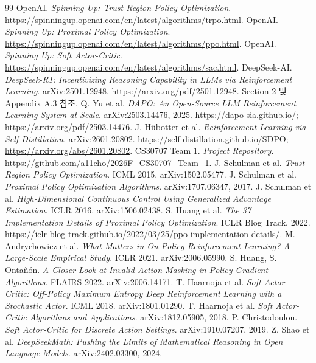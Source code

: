 \documentclass[11pt,a4paper]{article}
\begin{document}
\renewcommand{\refname}{참고 문헌 및 직접 링크}
\begingroup
\raggedright
\begin{thebibliography}{99}
 OpenAI. \emph{Spinning Up: Trust Region Policy Optimization}. \url{https://spinningup.openai.com/en/latest/algorithms/trpo.html}.
 OpenAI. \emph{Spinning Up: Proximal Policy Optimization}. \url{https://spinningup.openai.com/en/latest/algorithms/ppo.html}.
 OpenAI. \emph{Spinning Up: Soft Actor-Critic}. \url{https://spinningup.openai.com/en/latest/algorithms/sac.html}.
 DeepSeek-AI. \emph{DeepSeek-R1: Incentivizing Reasoning Capability in LLMs via Reinforcement Learning}. arXiv:2501.12948. \url{https://arxiv.org/pdf/2501.12948}. Section 2 및 Appendix A.3 참조.
 Q. Yu et al. \emph{DAPO: An Open-Source LLM Reinforcement Learning System at Scale}. arXiv:2503.14476, 2025. \url{https://dapo-sia.github.io/}; \url{https://arxiv.org/pdf/2503.14476}.
 J. H\"ubotter et al. \emph{Reinforcement Learning via Self-Distillation}. arXiv:2601.20802. \url{https://self-distillation.github.io/SDPO}; \url{https://arxiv.org/abs/2601.20802}.
 CS30707 Team 1. \emph{Project Repository}. \url{https://github.com/a11cho/2026F_CS30707_Team_1}.
 J. Schulman et al. \emph{Trust Region Policy Optimization}. ICML 2015. arXiv:1502.05477.
 J. Schulman et al. \emph{Proximal Policy Optimization Algorithms}. arXiv:1707.06347, 2017.
 J. Schulman et al. \emph{High-Dimensional Continuous Control Using Generalized Advantage Estimation}. ICLR 2016. arXiv:1506.02438.
 S. Huang et al. \emph{The 37 Implementation Details of Proximal Policy Optimization}. ICLR Blog Track, 2022. \url{https://iclr-blog-track.github.io/2022/03/25/ppo-implementation-details/}.
 M. Andrychowicz et al. \emph{What Matters in On-Policy Reinforcement Learning? A Large-Scale Empirical Study}. ICLR 2021. arXiv:2006.05990.
 S. Huang, S. Onta\~n\'on. \emph{A Closer Look at Invalid Action Masking in Policy Gradient Algorithms}. FLAIRS 2022. arXiv:2006.14171.
 T. Haarnoja et al. \emph{Soft Actor-Critic: Off-Policy Maximum Entropy Deep Reinforcement Learning with a Stochastic Actor}. ICML 2018. arXiv:1801.01290.
 T. Haarnoja et al. \emph{Soft Actor-Critic Algorithms and Applications}. arXiv:1812.05905, 2018.
 P. Christodoulou. \emph{Soft Actor-Critic for Discrete Action Settings}. arXiv:1910.07207, 2019.
 Z. Shao et al. \emph{DeepSeekMath: Pushing the Limits of Mathematical Reasoning in Open Language Models}. arXiv:2402.03300, 2024.

\end{thebibliography}
\end{document}
